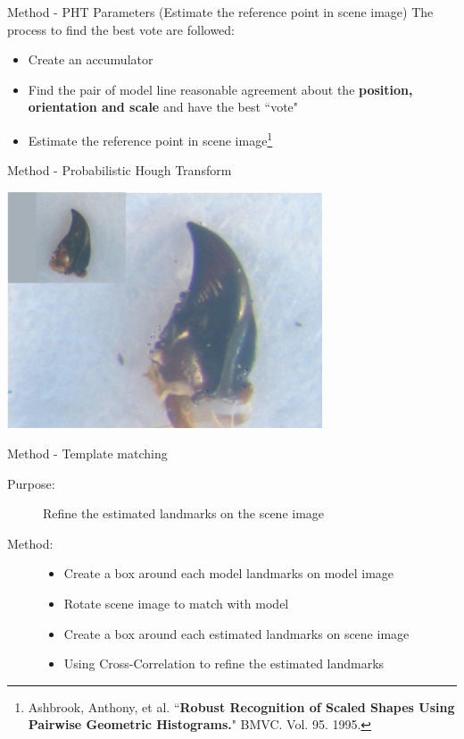 \documentclass{beamer}
\begin{document}
\begin{frame}{Method - PHT Parameters (Estimate the reference point in scene image)}
	The process to find the best vote are followed:
	\begin{itemize}
		\item Create an accumulator
		\item Find the pair of model line reasonable agreement about the \textbf{position, orientation and scale} and have the best ``vote"
		\item Estimate the reference point in scene image\footnote{Ashbrook, Anthony, et al. ``\textbf{Robust Recognition of Scaled Shapes Using Pairwise Geometric Histograms.}" BMVC. Vol. 95. 1995.}
	\end{itemize}

\end{frame}
\begin{frame}{Method - Probabilistic Hough Transform}
	\begin{center}
		\includegraphics[height=7cm]{images/pht19.JPG}	
	\end{center}
\end{frame}
\begin{frame}{Method - Template matching}
	\begin{description}
		\item [Purpose:] Refine the estimated landmarks on the scene image 
		\item [Method:] 
			\begin{itemize}
				\item Create a box around each model landmarks on model image
				\item Rotate scene image to match with model
				\item Create a box around each estimated landmarks on scene image
				\item Using Cross-Correlation to refine the estimated landmarks
			\end{itemize}
	\end{description}
\end{frame}
\end{document}
